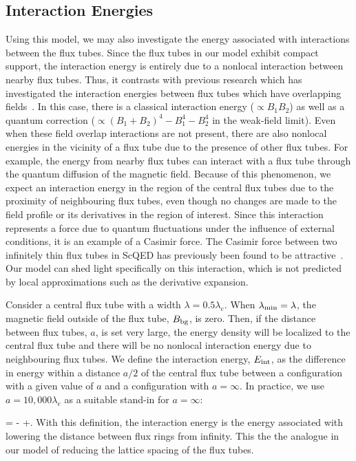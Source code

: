 \subsection{Interaction Energies}

Using this model, we may also investigate the energy associated with interactions 
between the flux tubes. Since the flux tubes in our model exhibit compact support, 
the interaction energy is entirely due to a nonlocal interaction between nearby 
flux tubes. Thus, it contrasts with previous research which has investigated the 
interaction energies between flux tubes which have 
overlapping fields~\cite{Langfeld:2002vy}. In this 
case, there is a classical interaction energy ($\propto B_1 B_2$) as well as 
a quantum correction ($\propto (B_1 + B_2)^4 - B_1^4 - B_2^4$ in the weak-field limit). 
Even when these field overlap interactions are not present, 
there are also nonlocal energies in the 
vicinity of a flux tube due to the presence of other flux tubes. For example, 
the energy from nearby flux tubes can interact with a flux tube through the 
quantum diffusion of the magnetic field. Because of this 
phenomenon, we expect an interaction energy in the region of the central flux tubes 
due to the proximity of neighbouring flux tubes, even though no changes are made 
to the field profile or its derivatives in the region of interest. 
Since this interaction represents a force due to 
quantum fluctuations under the influence 
of external conditions, it is an example of a Casimir force. The Casimir force between 
two infinitely thin flux tubes in \ac{ScQED} has previously been found to be attractive~\cite{duru1993}. Our model 
can shed light specifically on this interaction, which is not predicted by 
local approximations such as the derivative expansion.

Consider a central flux tube with a width $\lambda = 0.5\lambda_e$. 
When $\lambda_{\rm min} = \lambda$, 
the magnetic field outside of the flux tube, $B_{\rm bg}$, is zero. Then, if the distance 
between flux tubes, $a$, is set very large, the energy density will be 
localized to the central flux tube and there will be no nonlocal interaction 
energy due to neighbouring flux tubes.
We define the interaction energy, $E_{\rm int}$, as the 
difference in energy within a distance $a/2$ of the central flux tube
between a configuration with a given value of $a$ 
and a configuration with $a = \infty$. In practice, we use $a = 10,000\lambda_e$ as 
a suitable stand-in for $a = \infty$:

\be
	 = - 
	+.
\ee
With this definition, the interaction energy is the energy associated with 
lowering the distance between flux rings from infinity. This the the analogue 
in our model of reducing the lattice spacing of the flux tubes.

